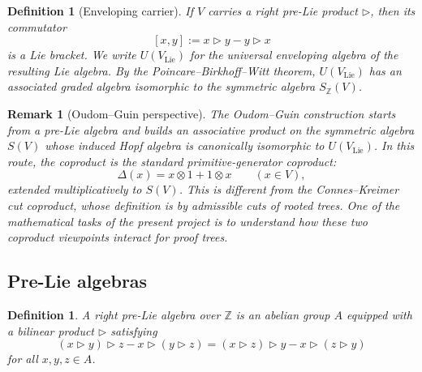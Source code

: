 \documentclass[11pt]{article}
\newtheorem{definition}[theorem]{Definition}
\newtheorem{remark}[theorem]{Remark}
\newcommand{\ZZ}{\mathbb{Z}}
\begin{document}
\begin{definition}[Enveloping carrier]
If \(V\) carries a right pre-Lie product \(\triangleright\), then its
commutator
\[
[x,y]:=x\triangleright y-y\triangleright x
\]
is a Lie bracket. We write \(U(V_{\mathrm{Lie}})\) for the universal
enveloping algebra of the resulting Lie algebra. By the
Poincare--Birkhoff--Witt theorem, \(U(V_{\mathrm{Lie}})\) has an associated
graded algebra isomorphic to the symmetric algebra \(S_{\ZZ}(V)\).
\end{definition}

\begin{remark}[Oudom--Guin perspective]
The Oudom--Guin construction starts from a pre-Lie algebra and builds an
associative product on the symmetric algebra \(S(V)\) whose induced Hopf
algebra is canonically isomorphic to \(U(V_{\mathrm{Lie}})\). In this route,
the coproduct is the standard primitive-generator coproduct:
\[
\Delta(x)=x\otimes 1+1\otimes x
\qquad (x\in V),
\]
extended multiplicatively to \(S(V)\). This is different from the
Connes--Kreimer cut coproduct, whose definition is by admissible cuts of
rooted trees. One of the mathematical tasks of the present project is to
understand how these two coproduct viewpoints interact for proof trees.
\end{remark}

\subsection{Pre-Lie algebras}

\begin{definition}
A \emph{right pre-Lie algebra} over \(\ZZ\) is an abelian group \(A\) equipped
with a bilinear product \(\triangleright\) satisfying
\[
(x\triangleright y)\triangleright z - x\triangleright (y\triangleright z)
=
(x\triangleright z)\triangleright y - x\triangleright (z\triangleright y)
\]
for all \(x,y,z\in A\).
\end{definition}
\end{document}
